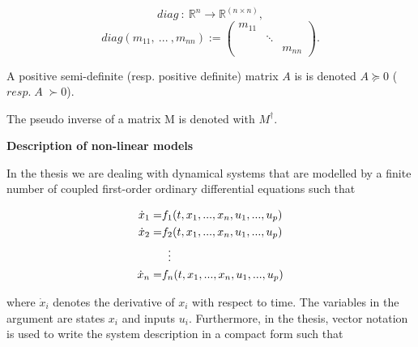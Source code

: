\begin{equation*}
diag \: : \: \mathbb{R}^{n} \rightarrow \mathbb{R}^{(n \times n)},
\end{equation*}
\begin{equation*}
diag(m_{11},\: ... \:, m_{nn} ) := 
\begin{pmatrix}
    m_{11} & & \\
    & \ddots & \\
    & & m_{nn}
  \end{pmatrix}.
  \end{equation*}

A positive semi-definite (resp. positive definite) matrix $A$ is is denoted $A \succeq 0$ ($resp.\; A \; \succ 0$).

The pseudo inverse of a matrix M is denoted with $M^{\dagger}$.

\textbf{Description of non-linear models}

In the thesis we are dealing with dynamical systems that are modelled by a finite number of coupled first-order ordinary differential equations such that 

\vspace{-4mm}
\begin{equation*}
\begin{split}
  \label{non-inlet_p1}
  \dot{x}_1 = & f_1(t,x_1, ..., x_n,u_1,...,u_p) \\
  \dot{x}_2 = & f_2(t,x_1, ..., x_n,u_1,...,u_p) \\
   &\mathrel{\makebox[\widthof{=}]{\vdots}} \\
   \dot{x}_n = & f_n(t,x_1, ..., x_n,u_1,...,u_p)
\end{split}
\end{equation*}

where $\dot{x}_i$ denotes the derivative of $x_i$ with respect to time. The variables in the argument are states $x_i$ and inputs $u_i$. Furthermore, in the thesis, vector notation is used to write the system description in a compact form such that 

